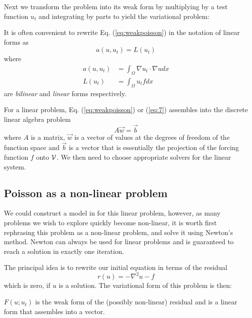 Next we transform the problem into its weak form by multiplying by a
test function $u_{t}$ and integrating by parts to yield the
variational problem: 
\begin{quote}
\end{quote}
It is often convenient to rewrite Eq. (\ref{eq:weakpoisson}) in the
notation of linear forms as
\begin{equation}
\label{eq:7}
  a(u,u_{t}) = L(u_{t})
\end{equation}
where
\begin{align}
  \label{eq:5}
  a(u,u_{t}) &= \int_\Omega \nabla u_t\cdot \nabla u dx\\
  L(u_{t})    &=  \int_\Omega u_t f dx
\end{align}
are \emph{bilinear} and \emph{linear} forms respectively.

For a linear problem, Eq. (\ref{eq:weakpoisson}) or (\ref{eq:7})
assembles into the discrete linear algebra problem
\begin{equation}
  \label{eq:1}
  A\vec{w} = \vec{b}
\end{equation}
where $A$ is a matrix, $\vec{w}$ is a vector of values at the degrees
of freedom of the function space and $\vec{b}$ is a vector that is essentially the
projection of the forcing function $f$ onto $\mathcal{V}$.  We then need
to choose appropriate solvers for the linear system.

\subsection{Poisson as a non-linear problem}
\label{sec:poisson-as-non}

We could construct a model in \TF{} for this linear problem, however, as many
problems we wish to explore  quickly become non-linear, it is worth
first rephrasing this problem as a non-linear problem, and solve it
using Newton's method.  Newton can always be used for linear problems
and is guaranteed to reach a solution in exactly one iteration. %

The principal idea is to rewrite our initial equation in terms of the residual
\begin{equation}
  \label{eq:2}
  r(u) = -\nabla^2 u - f
\end{equation}
which is zero, if $u$ is a solution.  The variational form of this
problem  is then:
\begin{quote}
\end{quote} 
$F(u;u_{t})$ is the weak form of the (possibly non-linear) residual
and is a linear form that assembles into a vector.

